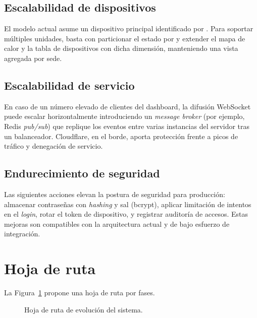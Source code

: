 \subsection{Escalabilidad de dispositivos}
El modelo actual asume un dispositivo principal identificado por . Para soportar múltiples unidades, basta con particionar el estado por  y extender el mapa de calor y la tabla de dispositivos con dicha dimensión, manteniendo una vista agregada por sede.

\subsection{Escalabilidad de servicio}
En caso de un número elevado de clientes del dashboard, la difusión WebSocket puede escalar horizontalmente introduciendo un \emph{message broker} (por ejemplo, Redis \emph{pub/sub}) que replique los eventos entre varias instancias del servidor tras un balanceador. Cloudflare, en el borde, aporta protección frente a picos de tráfico y denegación de servicio.

\subsection{Endurecimiento de seguridad}
Las siguientes acciones elevan la postura de seguridad para producción: almacenar contraseñas con \emph{hashing} y sal (bcrypt), aplicar limitación de intentos en el \emph{login}, rotar el token de dispositivo, y registrar auditoría de accesos. Estas mejoras son compatibles con la arquitectura actual y de bajo esfuerzo de integración.

\section{Hoja de ruta}
La Figura~\ref{fig:roadmap} propone una hoja de ruta por fases.

\begin{figure}[H]
\centering
{}
\caption{Hoja de ruta de evolución del sistema.}
\label{fig:roadmap}
\end{figure}

